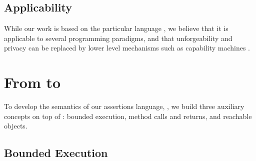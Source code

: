 \subsection*{Applicability} 
While our work is based on the particular language  \LangOO , %
we believe that it is applicable to several programming paradigms, and  that   unforgeability and privacy
 can be replaced  by lower level mechanisms such as capability machines \cite{vanproving,davis2019cheriabi}.


\section{From \LangOO to \AssertLang}

{To develop the semantics of our assertions language, \AssertLang, we   build three auxiliary concepts on  top of  \LangOO: bounded execution, method calls and returns, and reachable objects.}


\subsection{Bounded Execution}
\label{sect:bounded}

